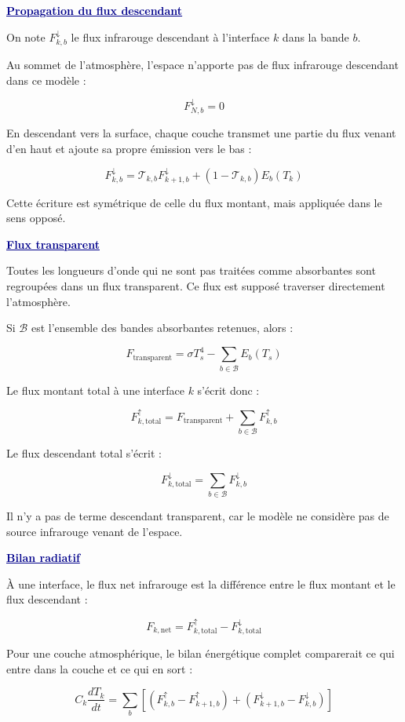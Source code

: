 \documentclass[11pt,a4paper]{article}
\newcommand{\bloc}[1]{\vspace{0.9em}\noindent\textcolor{DarkBlue}{\underline{\textbf{#1}}}\par\vspace{0.35em}}
\begin{document}
\bloc{Propagation du flux descendant}

On note $F^\downarrow_{k,b}$ le flux infrarouge descendant à l'interface $k$ dans la bande $b$.

Au sommet de l'atmosphère, l'espace n'apporte pas de flux infrarouge descendant dans ce modèle :

\[
F^\downarrow_{N,b} = 0
\]

En descendant vers la surface, chaque couche transmet une partie du flux venant d'en haut et ajoute sa propre émission vers le bas :

\[
F^\downarrow_{k,b}
=
\mathcal{T}_{k,b} F^\downarrow_{k+1,b}
+
\left(1-\mathcal{T}_{k,b}\right)E_b(T_k)
\]

Cette écriture est symétrique de celle du flux montant, mais appliquée dans le sens opposé.

\bloc{Flux transparent}

Toutes les longueurs d'onde qui ne sont pas traitées comme absorbantes sont regroupées dans un flux transparent. Ce flux est supposé traverser directement l'atmosphère.

Si $\mathcal{B}$ est l'ensemble des bandes absorbantes retenues, alors :

\[
F_{\mathrm{transparent}}
=
\sigma T_s^4
-
\sum_{b\in\mathcal{B}} E_b(T_s)
\]

Le flux montant total à une interface $k$ s'écrit donc :

\[
F^\uparrow_{k,\mathrm{total}}
=
F_{\mathrm{transparent}}
+
\sum_{b\in\mathcal{B}}F^\uparrow_{k,b}
\]

Le flux descendant total s'écrit :

\[
F^\downarrow_{k,\mathrm{total}}
=
\sum_{b\in\mathcal{B}}F^\downarrow_{k,b}
\]

Il n'y a pas de terme descendant transparent, car le modèle ne considère pas de source infrarouge venant de l'espace.

\bloc{Bilan radiatif}

À une interface, le flux net infrarouge est la différence entre le flux montant et le flux descendant :

\[
F_{k,\mathrm{net}}
=
F^\uparrow_{k,\mathrm{total}}
-
F^\downarrow_{k,\mathrm{total}}
\]

Pour une couche atmosphérique, le bilan énergétique complet comparerait ce qui entre dans la couche et ce qui en sort :

\[
C_k\frac{dT_k}{dt}
=
\sum_b
\left[
\left(F^\uparrow_{k,b}-F^\uparrow_{k+1,b}\right)
+
\left(F^\downarrow_{k+1,b}-F^\downarrow_{k,b}\right)
\right]
\]
\end{document}
